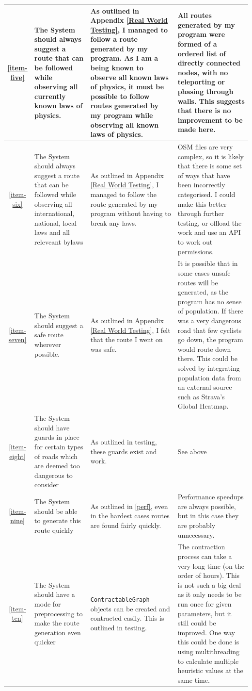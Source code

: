 \documentclass[11pt,twoside,a4paper]{report}
\begin{document}
\begin{longtable}[c]{|c|p{3cm}|p{5cm}|p{5cm}|}
    \hline
    \ref{item-five} & The System should always suggest a route that can be followed while observing all currently known laws of physics. & As outlined in Appendix \ref{Real World Testing}, I managed to follow a route generated by my program. As I am a being known to observe all known laws of physics, it must be possible to follow routes generated by my program while observing all known laws of physics. & All routes generated by my program were formed of a ordered list of directly connected nodes, with no teleporting or phasing through walls. This suggests that there is no improvement to be made here.\\
    \hline
    \ref{item-six} & The System should always suggest a route that can be followed while observing all international, national, local laws and all releveant bylaws & As outlined in Appendix \ref{Real World Testing}, I managed to follow the route generated by my program without having to break any laws. & OSM files are very complex, so it is likely that there is some set of ways that have been incorrectly categorised. I could make this better through further testing, or offload the work and use an API to work out permissions. \\
    \hline
    \ref{item-seven} & The System should suggest a safe route wherever possible. & As outlined in Appendix \ref{Real World Testing}, I felt that the route I went on was safe. & It is possible that in some cases unsafe routes will be generated, as the program has no sense of population. If there was a very dangerous road that few cyclists go down, the program would route down there. This could be solved by integrating population data from an external source such as Strava's Global Heatmap. \\
    \hline
    \ref{item-eight} & The System should have guards in place for certain types of roads which are deemed too dangerous to consider & As outlined in testing, these guards exist and work. & See above\\
    \hline
    \ref{item-nine} & The System should be able to generate this route quickly & As outlined in \ref{perf}, even in the hardest cases routes are found fairly quickly. & Performance speedups are always possible, but in this case they are probably unnecessary.\\
    \hline
    \ref{item-ten} & The System should have a mode for preprocessing to make the route generation even quicker & \texttt{ContractableGraph} objects can be created and contracted easily. This is outlined in testing. & The contraction process can take a very long time (on the order of hours). This is not such a big deal as it only needs to be run once for given parameters, but it still could be improved. One way this could be done is using multithreading to calculate multiple heuristic values at the same time. \\

\end{longtable}
\end{document}
